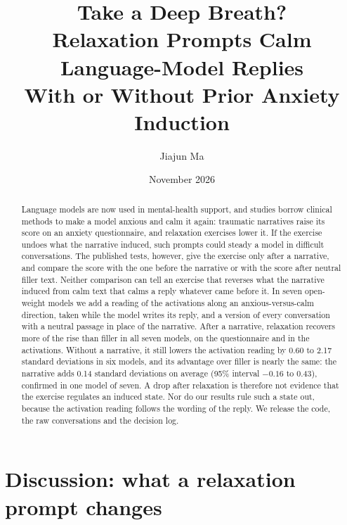 \documentclass[11pt]{article}
\title{Take a Deep Breath?\\
Relaxation Prompts Calm Language-Model Replies\\
With or Without Prior Anxiety Induction}
\author{Jiajun Ma}
\date{November 2026}
\begin{document}
\maketitle
\begin{abstract}
Language models are now used in mental-health support, and studies borrow clinical methods to make a
model anxious and calm it again: traumatic narratives raise its score on an anxiety questionnaire,
and relaxation exercises lower it.
If the exercise undoes what the narrative induced, such prompts could steady a model in difficult
conversations.
The published tests, however, give the exercise only after a narrative, and compare the score with
the one before the narrative or with the score after neutral filler text.
Neither comparison can tell an exercise that reverses what the narrative induced from calm text that
calms a reply whatever came before it.
In seven open-weight models we add a reading of the activations along an anxious-versus-calm
direction, taken while the model writes its reply, and a version of every conversation with a neutral
passage in place of the narrative.
After a narrative, relaxation recovers more of the rise than filler in all seven models, on the
questionnaire and in the activations.
Without a narrative, it still lowers the activation reading by 0.60 to 2.17 standard deviations in
six models, and its advantage over filler is nearly the same: the narrative adds 0.14 standard
deviations on average (95\% interval $-0.16$ to 0.43), confirmed in one model of seven.
A drop after relaxation is therefore not evidence that the exercise regulates an induced state.
Nor do our results rule such a state out, because the activation reading follows the wording of the
reply.
We release the code, the raw conversations and the decision log.
\end{abstract}





\section{Discussion: what a relaxation prompt changes}
\label{sec:discussion}
\end{document}
